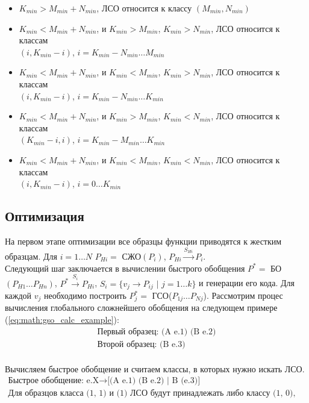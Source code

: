 \documentclass[12pt]{article}
\begin{document}
\begin{itemize}
\item $K_{min} > M_{min} + N_{min}$, ЛСО относится к классу $(M_{min}, N_{min})$
\item $K_{min} < M_{min} + N_{min}$, и $K_{min} > M_{min}$, $K_{min} > N_{min}$, ЛСО относится к классам\\ \indent$(i, K_{min} - i)$, $i = K_{min} - N_{min} \ldots M_{min}$ 
\item $K_{min} < M_{min} + N_{min}$, и $K_{min} < M_{min}$, $K_{min} > N_{min}$, ЛСО относится к классам\\ \indent$(i, K_{min} - i)$, $i = K_{min} - N_{min} \ldots K_{min}$ 
\item $K_{min} < M_{min} + N_{min}$, и $K_{min} > M_{min}$, $K_{min} < N_{min}$, ЛСО относится к классам\\ \indent$(K_{min} - i, i)$, $i = K_{min} - M_{min} \ldots K_{min}$
\item $K_{min} < M_{min} + N_{min}$, и $K_{min} < M_{min}$, $K_{min} < N_{min}$, ЛСО относится к классам\\ \indent$(i, K_{min} - i)$, $i = 0 \ldots K_{min}$
\end{itemize}
 

\subsection[Оптимизация]{\large Оптимизация}
\hspace{\parindent} На первом этапе оптимизации все образцы функции приводятся к жестким образцам. Для $i = 1 \ldots N$ $P_{Hi} = $ СЖО$(P_i)$, $P_{Hi} \xrightarrow{S_{Hi}} P_i$.\\
\indent Следующий шаг заключается в вычислении быстрого обобщения $P^{*} = $ БО$(P_{H1} \ldots P_{Hn})$, $P^{*} \xrightarrow{S_i} P_{Hi}$, $S_i = \{v_j \to P_{ij}$ $|$ $j = 1\ldots k \}$ и генерации его кода. Для каждой $v_j$ необходимо построить $P_j^* = $ ГСО($P_{1j} \ldots P_{Nj}$). Рассмотрим процес вычисления глобального сложнейшего обобщения на следующем примере (\ref{eq:math:gso_calc_example}):
\begin{equation}\label{eq:math:gso_calc_example}
\begin{array}{l}
\textrm{Первый образец: (A e.1) (B e.2)} \\
\textrm{Второй образец: (B e.3)} \\
\end{array}
\end{equation} 

\indent Вычисляем быстрое обобщение и считаем классы, в которых нужно искать ЛСО.
\begin{equation*}
\begin{array}{l}
\textrm{Быстрое обобщение: e.X}\rightarrow \textrm{[(A e.1) (B e.2) | B (e.3)]} \\
\textrm{Для образцов класса (1, 1) и (1) ЛСО будут принадлежать либо классу (1, 0), либо (0, 1)} \\
\end{array}
\end{equation*} 
\end{document}
